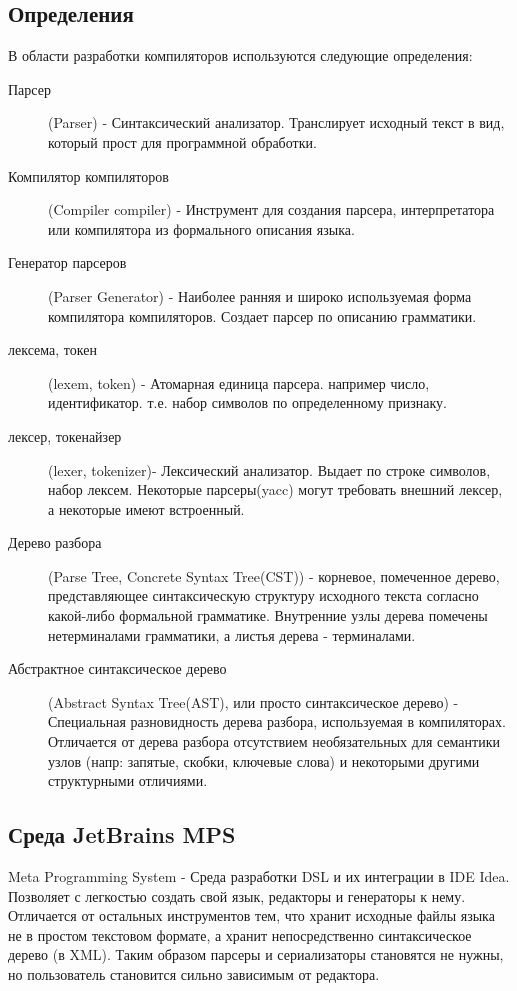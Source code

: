 \documentclass[a4paper,12pt]{article}
\begin{document}
\subsection{Определения}
В области разработки компиляторов используются следующие определения:
\begin{description}
  \item[Парсер] (Parser) -
    Синтаксический анализатор. Транслирует исходный текст в вид, который прост
    для программной обработки.
  \item[Компилятор компиляторов] (Compiler compiler) -
	Инструмент для создания парсера, интерпретатора или компилятора из формального
	описания языка.
  \item[Генератор парсеров] (Parser Generator) -
  	Наиболее ранняя и широко используемая форма компилятора компиляторов.
  	Создает парсер по описанию грамматики. 
  \item[лексема, токен] (lexem, token) - 
  	Атомарная единица парсера. например число, идентификатор. т.е. набор
  	символов по определенному признаку.
  \item[лексер, токенайзер] (lexer, tokenizer)-
  	Лексический анализатор. Выдает по строке символов, набор лексем. Некоторые
  	парсеры(yacc) могут требовать внешний лексер, а некоторые имеют встроенный.
  \item[Дерево разбора] (Parse Tree, Concrete Syntax Tree(CST)) -
  	корневое, помеченное дерево, представляющее синтаксическую структуру
  	исходного текста согласно какой-либо формальной грамматике. Внутренние узлы
  	дерева помечены нетерминалами грамматики, а листья дерева - терминалами.
  \item[Абстрактное синтаксическое дерево] (Abstract Syntax Tree(AST), или
  просто синтаксическое дерево) - Специальная разновидность дерева разбора,
  используемая в компиляторах. Отличается от дерева разбора отсутствием
  необязательных для семантики узлов (напр: запятые, скобки, ключевые слова) и
  некоторыми другими структурными отличиями.
\end{description}

\subsection{Среда JetBrains MPS}
Meta Programming System - Среда разработки DSL и их интеграции в IDE Idea.
Позволяет с легкостью создать свой язык, редакторы и генераторы к нему.
Отличается от остальных инструментов тем, что хранит исходные файлы языка не в
простом текстовом формате, а хранит непосредственно синтаксическое дерево (в
XML). Таким образом парсеры и сериализаторы становятся не нужны, но
пользователь становится сильно зависимым от редактора.
\end{document}
